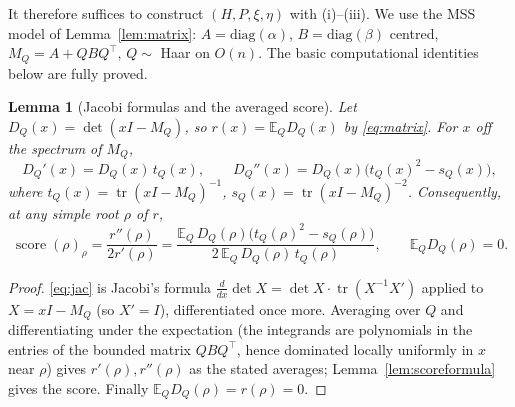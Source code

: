 \documentclass[12pt]{article}
\newtheorem{lemma}{Lemma}
\theoremstyle{definition}
\DeclareMathOperator{\score}{score}
\DeclareMathOperator{\tr}{tr}
\newcommand{\bE}{\mathbb{E}}
\begin{document}
It therefore suffices to construct $(H,P,\xi,\eta)$ with (i)--(iii). We use the MSS model of
Lemma~\ref{lem:matrix}: $A=\mathrm{diag}(\alpha)$, $B=\mathrm{diag}(\beta)$ centred,
$M_Q=A+QBQ^\top$, $Q\sim$ Haar on $O(n)$. The basic computational identities below are
fully proved.

\begin{lemma}[Jacobi formulas and the averaged score]\label{lem:jacobi}
Let $D_Q(x)=\det(xI-M_Q)$, so $r(x)=\bE_Q D_Q(x)$ by \eqref{eq:matrix}. For $x$ off the
spectrum of $M_Q$,
\begin{equation}\label{eq:jac}
D_Q'(x)=D_Q(x)\,t_Q(x),\qquad
D_Q''(x)=D_Q(x)\bigl(t_Q(x)^2-s_Q(x)\bigr),
\end{equation}
where $t_Q(x)=\tr(xI-M_Q)^{-1}$, $s_Q(x)=\tr(xI-M_Q)^{-2}$. Consequently, at any simple
root $\rho$ of $r$,
\begin{equation}\label{eq:scoreavg}
\score(\rho)_\rho=\frac{r''(\rho)}{2r'(\rho)}
=\frac{\bE_Q\,D_Q(\rho)\bigl(t_Q(\rho)^2-s_Q(\rho)\bigr)}{2\,\bE_Q\,D_Q(\rho)\,t_Q(\rho)} ,
\qquad \bE_Q D_Q(\rho)=0 .
\end{equation}
\end{lemma}

\begin{proof}
\eqref{eq:jac} is Jacobi's formula $\frac{d}{dx}\det X=\det X\cdot\tr(X^{-1}X')$ applied to
$X=xI-M_Q$ (so $X'=I$), differentiated once more. Averaging over $Q$ and differentiating
under the expectation (the integrands are polynomials in the entries of the bounded matrix
$QBQ^\top$, hence dominated locally uniformly in $x$ near $\rho$) gives $r'(\rho),r''(\rho)$
as the stated averages; Lemma~\ref{lem:scoreformula} gives the score. Finally
$\bE_Q D_Q(\rho)=r(\rho)=0$.
\end{proof}
\end{document}
